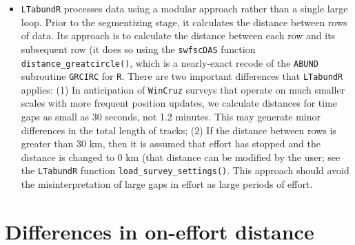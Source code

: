 \documentclass[
]{book}
\begin{document}
\begin{itemize}
\item
  \texttt{LTabundR} processes data using a modular approach rather than a single large loop. Prior to the segmentizing stage, it calculates the distance between rows of data. Its approach is to calculate the distance between each row and its subsequent row (it does so using the \texttt{swfscDAS} function \texttt{distance\_greatcircle()}, which is a nearly-exact recode of the \texttt{ABUND} subroutine \texttt{GRCIRC} for \texttt{R}. There are two important differences that \texttt{LTabundR} applies: (1) In anticipation of \texttt{WinCruz} surveys that operate on much smaller scales with more frequent position updates, we calculate distances for time gaps as small as 30 seconds, not 1.2 minutes. This may generate minor differences in the total length of tracks; (2) If the distance between rows is greater than 30 km, then it is assumed that effort has stopped and the distance is changed to 0 km (that distance can be modified by the user; see the \texttt{LTabundR} function \texttt{load\_survey\_settings()}. This approach should avoid the misinterpretation of large gaps in effort as large periods of effort.
\end{itemize}

\hypertarget{differences-in-on-effort-distance}{%
\section*{Differences in on-effort distance}\label{differences-in-on-effort-distance}}
\end{document}
